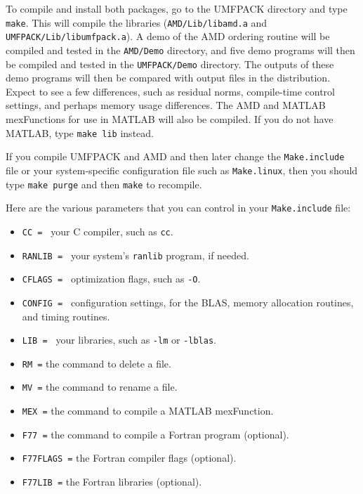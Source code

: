 \documentclass[11pt]{article}
\begin{document}
To compile and install both packages,
go to the UMFPACK directory and type {\tt make}.  This will compile the
libraries ({\tt AMD/Lib/libamd.a} and {\tt UMFPACK/Lib/libumfpack.a}).
A demo of the AMD ordering routine will be compiled and tested in
the {\tt AMD/Demo} directory, and five demo programs will then be
compiled and tested in the {\tt UMFPACK/Demo} directory.
The outputs of these demo programs will then be compared with output
files in the distribution.  Expect to see a few differences, such as
residual norms, compile-time control settings, and perhaps memory usage
differences.  The AMD and MATLAB mexFunctions for
use in MATLAB will also be compiled.  If you do not have MATLAB,
type {\tt make lib} instead.

If you compile UMFPACK and AMD and then later change the {\tt Make.include}
file or your system-specific configuration file such as {\tt Make.linux},
then you should type {\tt make purge} and then {\tt make} to recompile.

Here are the various parameters that you can control in your
{\tt Make.include} file:

\begin{itemize}
\item {\tt CC = } your C compiler, such as {\tt cc}.
\item {\tt RANLIB = } your system's {\tt ranlib} program, if needed.
\item {\tt CFLAGS = } optimization flags, such as {\tt -O}.
\item {\tt CONFIG = } configuration settings, for the BLAS, memory allocation
    routines, and timing routines.
\item {\tt LIB = } your libraries, such as {\tt -lm} or {\tt -lblas}.
\item {\tt RM =} the command to delete a file.
\item {\tt MV =} the command to rename a file.
\item {\tt MEX =} the command to compile a MATLAB mexFunction.
\item {\tt F77 =} the command to compile a Fortran program (optional).
\item {\tt F77FLAGS =} the Fortran compiler flags (optional).
\item {\tt F77LIB =} the Fortran libraries (optional).
\end{itemize}
\end{document}
